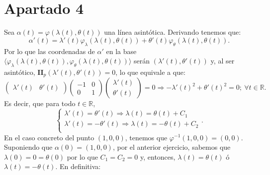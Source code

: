 \section{Apartado 4}
Sea $\alpha\left( t \right) = \varphi\left( \lambda \left( t \right), \theta
\left( t \right) \right)$ una línea asintótica. Derivando tenemos que:
\[
\alpha'\left( t \right) = \lambda'\left( t \right) \varphi_{\lambda}\left(
\lambda\left( t \right), \theta\left( t \right) \right) + \theta'\left( t
\right) \varphi_{\theta} \left( \lambda\left( t \right), \theta\left( t \right)
\right).
\]
Por lo que las coordenadas de $\alpha'$ en la base $\langle \varphi_{\lambda}
\left( \lambda\left( t \right), \theta\left( t \right) \right), \varphi_{\theta}
\left( \lambda \left( t \right), \theta\left( t \right) \right)\rangle$ serán
$\left( \lambda'\left( t \right), \theta'\left( t \right) \right)$ y, al ser
asintótico, $\mathbf{II}_p\left( \lambda'\left( t \right), \theta'\left( t
\right) \right) = 0$, lo que equivale a que:
\[
\begin{pmatrix}  \lambda'\left( t \right) & \theta'\left( t \right)  \end{pmatrix} \begin{pmatrix}
-1 & 0\\ 0 & 1 \end{pmatrix} \begin{pmatrix} \lambda'\left( t \right) \\
\theta'\left( t \right) \end{pmatrix} = 0 \Rightarrow -\lambda'\left( t
\right)^2 + \theta'\left( t \right)^2 = 0;\ \forall t \in \mathbb{R}.
\]
Es decir, que para todo $t \in \mathbb{R}$,
\[
\begin{cases}
    \lambda'\left( t \right) = \theta'\left( t \right) \Rightarrow \lambda\left(
    t\right) = \theta\left( t \right) + C_1\\
    \lambda'\left( t \right) = -\theta'\left( t \right) \Rightarrow
    \lambda\left( t\right) = -\theta\left( t \right) + C_2\\
\end{cases}.
\]
En el caso concreto del punto $\left( 1, 0, 0 \right)$, tenemos que
$\varphi^{-1}\left( 1, 0, 0 \right) = \left( 0, 0 \right)$. Suponiendo que
$\alpha\left( 0 \right) = \left( 1, 0, 0 \right)$, por el anterior ejercicio,
sabemos que $\lambda\left( 0 \right) = 0 = \theta\left( 0 \right)$ por lo que
$C_1 = C_2 = 0$ y, entonces, $\lambda\left( t \right) = \theta\left( t \right)$
ó $\lambda\left( t \right) = -\theta\left( t \right)$. En definitiva:
